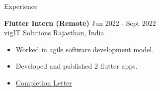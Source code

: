 \documentclass{resume}
\begin{document}
\begin{rSection}{Experience}
\vspace{-1em}
    \item \textbf{Flutter Intern (Remote)}
    \hfill Jun 2022 - Sept 2022
    \\ vigIT Solutions
    \hfill Rajasthan, India
    \begin{itemize}
        \setlength\itemsep{-0.5em}
        \item Worked in agile software development model.
        \item Developed and published 2 flutter apps.
        \item \href{https://drive.google.com/file/d/1yF5baJ-uIWpwAHL0Sd-CwycYHjbyFumW/view?usp=sharing}{Completion Letter}
    \end{itemize}
\end{rSection}
\end{document}
